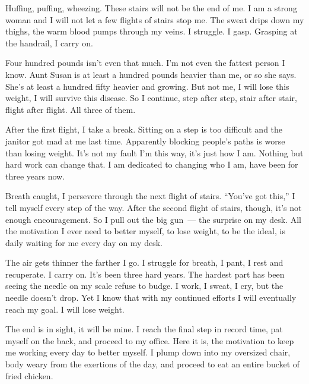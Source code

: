 Huffing, puffing, wheezing. These stairs will not be the end of me. I am a strong woman and I will not let a few flights of stairs stop me. The sweat drips down my thighs, the warm blood pumps through my veins. I struggle. I gasp. Grasping at the handrail, I carry on.

Four hundred pounds isn't even that much. I'm not even the fattest person I know. Aunt Susan is at least a hundred pounds heavier than me, or so she says. She's at least a hundred fifty heavier and growing. But not me, I will lose this weight, I will survive this disease. So I continue, step after step, stair after stair, flight after flight. All three of them.

After the first flight, I take a break. Sitting on a step is too difficult and the janitor got mad at me last time. Apparently blocking people's paths is worse than losing weight. It's not my fault I'm this way, it's just how I am. Nothing but hard work can change that. I am dedicated to changing who I am, have been for three years now.

Breath caught, I persevere through the next flight of stairs. ``You've got this,'' I tell myself every step of the way. After the second flight of stairs, though, it's not enough encouragement. So I pull out the big gun~--- the surprise on my desk. All the motivation I ever need to better myself, to lose weight, to be the ideal, is daily waiting for me every day on my desk.

The air gets thinner the farther I go. I struggle for breath, I pant, I rest and recuperate. I carry on. It's been three hard years. The hardest part has been seeing the needle on my scale refuse to budge. I work, I sweat, I cry, but the needle doesn't drop. Yet I know that with my continued efforts I will eventually reach my goal. I will lose weight.

The end is in sight, it will be mine. I reach the final step in record time, pat myself on the back, and proceed to my office. Here it is, the motivation to keep me working every day to better myself. I plump down into my oversized chair, body weary from the exertions of the day, and proceed to eat an entire bucket of fried chicken.
